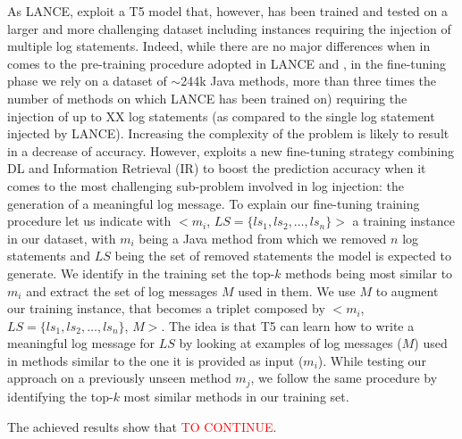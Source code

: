 As LANCE, \approach exploit a T5 model that, however, has been trained and tested on a larger and more challenging dataset including instances requiring the injection of multiple log statements. Indeed, while there are no major differences when in comes to the pre-training procedure adopted in LANCE and \approach, in the fine-tuning phase we rely on a dataset of $\sim$244k Java methods, more than three times the number of methods on which LANCE has been trained on) requiring the injection of up to XX log statements (as compared to the single log statement injected by LANCE). Increasing the complexity of the problem is likely to result in a decrease of accuracy. However, \approach exploits a new fine-tuning strategy combining DL and Information Retrieval (IR) to boost the prediction accuracy when it comes to the most challenging sub-problem involved in log injection: the generation of a meaningful log message. To explain our fine-tuning training procedure let us indicate with $<$$m_i$, $LS=\{ls_1, ls_2, \dots, ls_n\}$$>$ a training instance in our dataset, with $m_i$ being a Java method from which we removed $n$ log statements and $LS$ being the set of removed statements the model is expected to generate. We identify in the training set the top-$k$ methods being most similar to $m_i$ and extract the set of log messages $M$ used in them. We use $M$ to augment our training instance, that becomes a triplet composed by $<$$m_i$, $LS=\{ls_1, ls_2, \dots, ls_n\}$, $M$$>$. The idea is that T5 can learn how to write a meaningful log message for $LS$ by looking at examples of log messages ($M$) used in methods similar to the one it is provided as input ($m_i$). While testing our approach on a previously unseen method $m_j$, we follow the same procedure by identifying the top-$k$ most similar methods in our training set.

The achieved results show that \textcolor{red}{TO CONTINUE}.